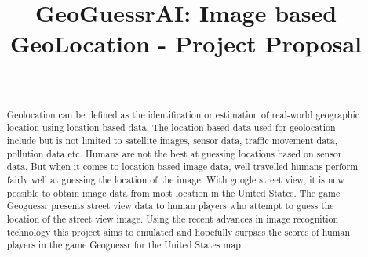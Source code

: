 \documentclass{sigchi}
\def\plaintitle{GeoGuessrAI: Image based GeoLocation - Project Proposal}
\begin{document}
\title{\plaintitle}

\author{%
  \\
}

\maketitle

\begin{abstract}
  Geolocation can be defined as the identification or estimation of real-world geographic location using location based data. The location based data used for geolocation include but is not limited to satellite images, sensor data, traffic movement data, pollution data etc. Humans are not the best at guessing locations based on sensor data. But when it comes to location based image data, well travelled humans perform fairly well at guessing the location of the image. With google street view, it is now possible to obtain image data from most location in the United States. The game Geoguessr \cite{Geoguessr:Online} presents street view data to human players who attempt to guess the location of the street view image. Using the recent advances in image recognition technology this project aims to emulated and hopefully surpass the scores of human players in the game Geoguessr for the United States map.
\end{abstract}
\end{document}
